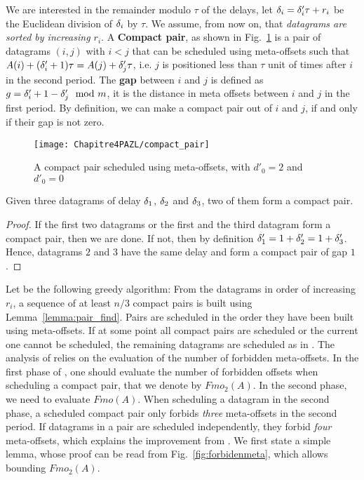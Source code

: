 We are interested in the remainder modulo $\tau$ of the delays, let $\delta_i = \delta_{i}'\tau + r_i$ be the Euclidean division of $\delta_i$ by $\tau$. We assume, from now on, that \emph{datagrams are sorted by increasing $r_i$}.
A \textbf{Compact pair}, as shown in Fig.~\ref{fig:compactpair} is a pair of datagrams $(i,j)$ with $i < j$ that can be scheduled using meta-offsets such that $A(i) + (\delta'_i+1)\tau = A(j) + \delta'_j\tau$, i.e. $j$ is positioned less than $\tau$ unit of times after $i$ in the second period.
The \textbf{gap} between $i$ and $j$ is defined as  $g = \delta_{i}' + 1 - \delta_{j}' \mod m$, it is the distance in meta offsets between $i$ and $j$ in the first period. By definition, we can make a compact pair out of $i$ and $j$, if and only if their gap is not zero.

\begin{figure}[h]
\begin{center}



\texttt{[image: Chapitre4PAZL/compact\_pair]}
\end{center}
\caption{A compact pair scheduled using meta-offsets, with $d'_0 = 2$ and $d'_0 = 0$}
\label{fig:compactpair}
\end{figure}

\begin{lemma}\label{lemma:pair_find}
Given three datagrams of delay $\delta_{1}$, $\delta_{2}$ and $\delta_{3}$, two of them form a compact pair. 
\end{lemma}
\begin{proof}
If the first two datagrams or the first and the third datagram form a compact pair,
then we are done. If not, then by definition $\delta_{1}' = 1 + \delta_{2}' = 1 + \delta_{3}'$. Hence, datagrams $2$ and $3$ have the same delay and form a compact pair of gap $1$.
\end{proof}

Let \compactpair be the following greedy algorithm: From the datagrams in order
of increasing $r_i$, a sequence of at least $n/3$ compact pairs is built using Lemma~\ref{lemma:pair_find}. Pairs are scheduled in the order they have been built using meta-offsets. If at some point all compact pairs are scheduled or the current one cannot be scheduled, the remaining datagrams are scheduled as in \metaoffset. The analysis of \compactpair relies on the evaluation of the number of forbidden meta-offsets. In the first phase of \compactpair, one should evaluate the number of forbidden offsets when scheduling a compact pair, that we denote by $Fmo_2(A)$. In the second phase, we need to evaluate $Fmo(A)$. When scheduling a datagram in the second phase, a scheduled compact pair only forbids \emph{three} meta-offsets in the second period. If datagrams in a pair are scheduled independently, they forbid \emph{four} meta-offsets, which explains the improvement from \compactpair. We first state a simple lemma, whose proof can be read from Fig.~\ref{fig:forbidenmeta}, which allows bounding $Fmo_2(A)$.

